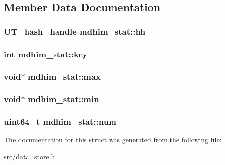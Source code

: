 \subsection{Member Data Documentation}
\hypertarget{structmdhim__stat_a7efece810db77a787513ba5577800d7a}{
\subsubsection[{hh}]{\setlength{\rightskip}{0pt plus 5cm}U\-T\-\_\-hash\-\_\-handle mdhim\-\_\-stat\-::hh}}\label{d1/d0b/structmdhim__stat_a7efece810db77a787513ba5577800d7a}
\hypertarget{structmdhim__stat_a8257aee706371a50726235fcb5d1cb6c}{
\subsubsection[{key}]{\setlength{\rightskip}{0pt plus 5cm}int mdhim\-\_\-stat\-::key}}\label{d1/d0b/structmdhim__stat_a8257aee706371a50726235fcb5d1cb6c}
\hypertarget{structmdhim__stat_ae563344828e5e734dc924d6192f5fde4}{
\subsubsection[{max}]{\setlength{\rightskip}{0pt plus 5cm}void$\ast$ mdhim\-\_\-stat\-::max}}\label{d1/d0b/structmdhim__stat_ae563344828e5e734dc924d6192f5fde4}
\hypertarget{structmdhim__stat_a66250dbd1b7be13842e4679ca46513b0}{
\subsubsection[{min}]{\setlength{\rightskip}{0pt plus 5cm}void$\ast$ mdhim\-\_\-stat\-::min}}\label{d1/d0b/structmdhim__stat_a66250dbd1b7be13842e4679ca46513b0}
\hypertarget{structmdhim__stat_a0630c9382b160becabc1eef79cedb95c}{
\subsubsection[{num}]{\setlength{\rightskip}{0pt plus 5cm}uint64\-\_\-t mdhim\-\_\-stat\-::num}}\label{d1/d0b/structmdhim__stat_a0630c9382b160becabc1eef79cedb95c}


The documentation for this struct was generated from the following file\-:\begin{DoxyCompactItemize}
\item 
src/\hyperlink{data__store_8h}{data\-\_\-store.\-h}\end{DoxyCompactItemize}
